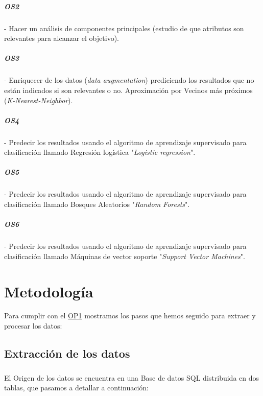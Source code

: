 \documentclass[10pt,a4paper,oneside]{book}
\begin{document}
\paragraph{OS2} - Hacer un análisis de componentes principales (estudio de que atributos son relevantes para alcanzar el objetivo).

\paragraph{OS3} - Enriquecer de los datos (\textit{data augmentation}) prediciendo los resultados que no están indicados si son relevantes o no. Aproximación por Vecinos más próximos (\textit{K-Nearest-Neighbor}).

\paragraph{OS4} - Predecir los resultados usando el algoritmo de aprendizaje supervisado para clasificación llamado Regresión logística "\textit{Logistic regression}".

\paragraph{OS5} - Predecir los resultados usando el algoritmo de aprendizaje supervisado para clasificación llamado Bosques Aleatorios "\textit{Random Forests}".

\paragraph{OS6} - Predecir los resultados usando el algoritmo de aprendizaje supervisado para clasificación llamado Máquinas de vector soporte "\textit{Support Vector Machines}".

\chapter{Metodología}

Para cumplir con el \hyperref[op:OP1]{OP1} mostramos los pasos que hemos seguido para extraer y procesar los datos:

\section{Extracción de los datos}

\paragraph{}
El Origen de los datos se encuentra en una Base de datos SQL distribuida en dos tablas, que pasamos a detallar a continuación:
\end{document}
